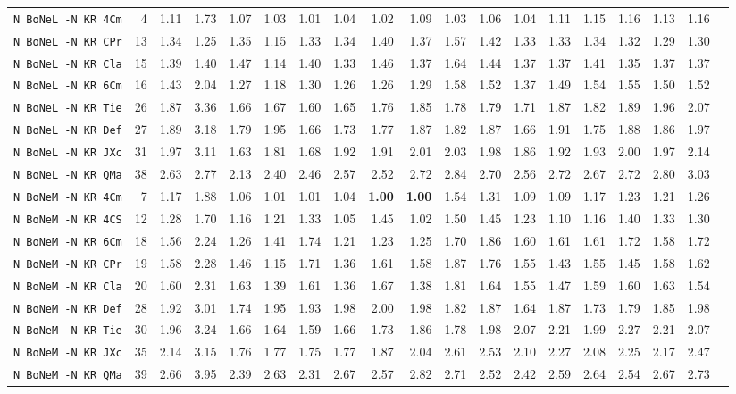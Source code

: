 \begin{tabular}{l | r @{~~} r | r@{~~}r@{~~}r@{~~}r@{~~}r@{~~}r@{~~}r@{~~}r@{~~}r@{~~}r@{~~}r@{~~}r@{~~}r@{~~}r@{~~}r@{~~}r|}
\verb+N BoNeL -N KR 4Cm+ & 4 & 1.11 & 1.73&1.07&1.03&1.01&1.04&1.02&1.09&1.03&1.06&1.04&1.11&1.15&1.16&1.13&1.16\\
\verb+N BoNeL -N KR CPr+ & 13 & 1.34 & 1.25&1.35&1.15&1.33&1.34&1.40&1.37&1.57&1.42&1.33&1.33&1.34&1.32&1.29&1.30\\
\verb+N BoNeL -N KR Cla+ & 15 & 1.39 & 1.40&1.47&1.14&1.40&1.33&1.46&1.37&1.64&1.44&1.37&1.37&1.41&1.35&1.37&1.37\\
\verb+N BoNeL -N KR 6Cm+ & 16 & 1.43 & 2.04&1.27&1.18&1.30&1.26&1.26&1.29&1.58&1.52&1.37&1.49&1.54&1.55&1.50&1.52\\
\verb+N BoNeL -N KR Tie+ & 26 & 1.87 & 3.36&1.66&1.67&1.60&1.65&1.76&1.85&1.78&1.79&1.71&1.87&1.82&1.89&1.96&2.07\\
\verb+N BoNeL -N KR Def+ & 27 & 1.89 & 3.18&1.79&1.95&1.66&1.73&1.77&1.87&1.82&1.87&1.66&1.91&1.75&1.88&1.86&1.97\\
\verb+N BoNeL -N KR JXc+ & 31 & 1.97 & 3.11&1.63&1.81&1.68&1.92&1.91&2.01&2.03&1.98&1.86&1.92&1.93&2.00&1.97&2.14\\
\verb+N BoNeL -N KR QMa+ & 38 & 2.63 & 2.77&2.13&2.40&2.46&2.57&2.52&2.72&2.84&2.70&2.56&2.72&2.67&2.72&2.80&3.03\smallskip \\
\verb+N BoNeM -N KR 4Cm+ & 7 & 1.17 & 1.88&1.06&1.01&1.01&1.04&\textbf{1.00}&\textbf{1.00}&1.54&1.31&1.09&1.09&1.17&1.23&1.21&1.26\\
\verb+N BoNeM -N KR 4CS+ & 12 & 1.28 & 1.70&1.16&1.21&1.33&1.05&1.45&1.02&1.50&1.45&1.23&1.10&1.16&1.40&1.33&1.30\\
\verb+N BoNeM -N KR 6Cm+ & 18 & 1.56 & 2.24&1.26&1.41&1.74&1.21&1.23&1.25&1.70&1.86&1.60&1.61&1.61&1.72&1.58&1.72\\
\verb+N BoNeM -N KR CPr+ & 19 & 1.58 & 2.28&1.46&1.15&1.71&1.36&1.61&1.58&1.87&1.76&1.55&1.43&1.55&1.45&1.58&1.62\\
\verb+N BoNeM -N KR Cla+ & 20 & 1.60 & 2.31&1.63&1.39&1.61&1.36&1.67&1.38&1.81&1.64&1.55&1.47&1.59&1.60&1.63&1.54\\
\verb+N BoNeM -N KR Def+ & 28 & 1.92 & 3.01&1.74&1.95&1.93&1.98&2.00&1.98&1.82&1.87&1.64&1.87&1.73&1.79&1.85&1.98\\
\verb+N BoNeM -N KR Tie+ & 30 & 1.96 & 3.24&1.66&1.64&1.59&1.66&1.73&1.86&1.78&1.98&2.07&2.21&1.99&2.27&2.21&2.07\\
\verb+N BoNeM -N KR JXc+ & 35 & 2.14 & 3.15&1.76&1.77&1.75&1.77&1.87&2.04&2.61&2.53&2.10&2.27&2.08&2.25&2.17&2.47\\
\verb+N BoNeM -N KR QMa+ & 39 & 2.66 & 3.95&2.39&2.63&2.31&2.67&2.57&2.82&2.71&2.52&2.42&2.59&2.64&2.54&2.67&2.73\smallskip \\

\end{tabular}
